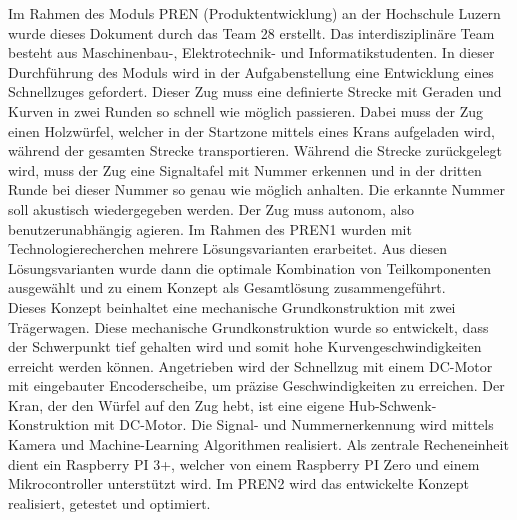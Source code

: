 \documentclass[../../main.tex]{subfiles}
\begin{document}
Im Rahmen des Moduls PREN (Produktentwicklung) an der Hochschule Luzern wurde dieses Dokument durch das Team 28
erstellt. Das interdisziplinäre Team besteht aus Maschinenbau-, Elektrotechnik- und Informatikstudenten. In dieser
Durchführung des Moduls wird in der Aufgabenstellung eine Entwicklung eines Schnellzuges gefordert. Dieser Zug muss eine
definierte Strecke mit Geraden und Kurven in zwei Runden so schnell wie möglich passieren. Dabei muss der Zug einen
Holzwürfel, welcher in der Startzone mittels eines Krans aufgeladen wird, während der gesamten Strecke transportieren.
Während die Strecke zurückgelegt wird, muss der Zug eine Signaltafel mit Nummer erkennen und in der dritten Runde bei
dieser Nummer so genau wie möglich anhalten. Die erkannte Nummer soll akustisch wiedergegeben werden. Der Zug muss
autonom, also benutzerunabhängig agieren. Im Rahmen des PREN1 wurden mit Technologierecherchen mehrere Lösungsvarianten
erarbeitet. Aus diesen Lösungsvarianten wurde dann die optimale Kombination von Teilkomponenten ausgewählt und zu einem
Konzept als Gesamtlösung zusammengeführt.\\
Dieses Konzept beinhaltet eine mechanische Grundkonstruktion mit zwei Trägerwagen. Diese mechanische Grundkonstruktion wurde so entwickelt, dass der Schwerpunkt tief gehalten wird und somit hohe Kurvengeschwindigkeiten erreicht werden können. Angetrieben wird der Schnellzug mit einem DC-Motor mit eingebauter Encoderscheibe, um präzise Geschwindigkeiten zu erreichen. Der Kran, der den Würfel auf den Zug hebt, ist eine eigene Hub-Schwenk-Konstruktion mit DC-Motor. Die Signal- und Nummernerkennung wird mittels Kamera und Machine-Learning Algorithmen realisiert. Als zentrale Recheneinheit dient ein Raspberry PI 3+, welcher von einem Raspberry PI Zero und einem Mikrocontroller unterstützt wird. Im PREN2 wird das entwickelte Konzept realisiert, getestet und optimiert.
\pagebreak
\end{document}
